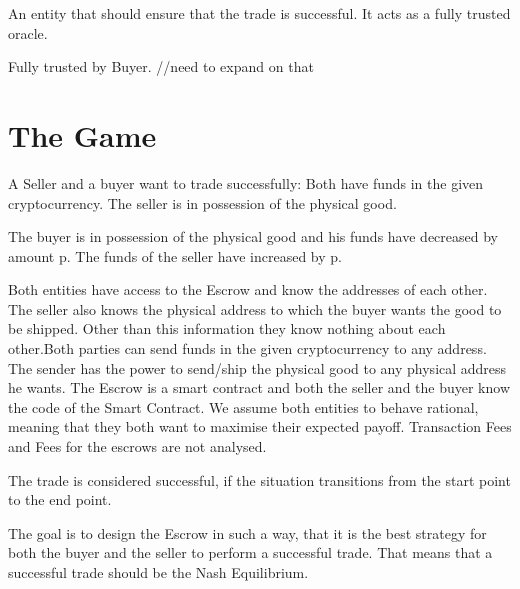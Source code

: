 \documentclass{cacthesis}
\begin{document}
 An entity that should ensure that the trade is successful. It acts as a fully trusted oracle.

 Fully trusted by Buyer.  //need to expand on that

\section{The Game}

A Seller and a buyer want to trade successfully: Both have funds in the given cryptocurrency. The seller is in possession of the physical good.

The buyer is in possession of the physical good and his funds have decreased by amount p. The funds of the seller have increased by p.

Both entities have access to the Escrow and know the addresses of each other. The seller also knows the physical address to which the buyer wants the good to be shipped. Other than this information they know nothing about each other.\newline Both parties can send funds in the given cryptocurrency to any address. The sender has the power to send/ship the physical good to any physical address he wants. The Escrow is a smart contract and both the seller and the buyer know the code of the Smart Contract.\newline
We assume both entities to behave rational, meaning that they both want to maximise their expected payoff.\newline
Transaction Fees and Fees for the escrows are not analysed.



The trade is considered successful, if the situation transitions from the start point to the end point.

The goal is to design the Escrow in such a way, that it is the best strategy for both the buyer and the seller to perform a successful trade. That means that a successful trade should be the Nash Equilibrium.

\end{document}
